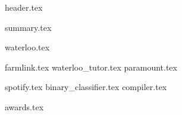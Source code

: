 \documentclass[11pt]{article}
\begin{document}
{header.tex}

{summary.tex}

{waterloo.tex}

{farmlink.tex}
{waterloo_tutor.tex}
{paramount.tex}

{spotify.tex}
{binary_classifier.tex}
{compiler.tex}

{awards.tex}
\end{document}
